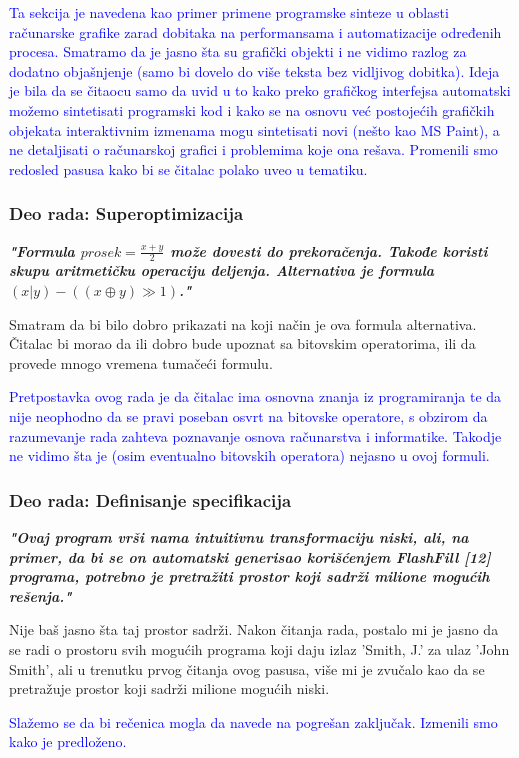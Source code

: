 \documentclass[a4paper]{report}
\newcommand{\odgovor}[1]{\textcolor{blue}{#1}}
\begin{document}
\odgovor{Ta sekcija je navedena kao primer primene programske sinteze u oblasti računarske grafike zarad dobitaka na performansama i automatizacije određenih procesa. Smatramo da je jasno šta su grafički objekti i ne vidimo razlog za dodatno objašnjenje (samo bi dovelo do više teksta bez vidljivog dobitka).  Ideja je bila da se čitaocu samo da uvid u to kako preko grafičkog interfejsa automatski možemo sintetisati programski kod i kako se na osnovu već postojećih grafičkih objekata interaktivnim izmenama mogu sintetisati novi (nešto kao MS Paint), a ne detaljisati o računarskoj grafici i problemima koje ona rešava. Promenili smo redosled pasusa kako bi se čitalac polako uveo u tematiku.}


\subsubsection{Deo rada: Superoptimizacija}
\textbf{\textit{"Formula $prosek = \frac{x+y}{2}$ može dovesti do prekoračenja. Takođe koristi skupu aritmetičku operaciju deljenja. Alternativa je formula $(x | y) - ((x \oplus y) \gg 1)$."}}

Smatram da bi bilo dobro prikazati na koji način je ova formula alternativa. Čitalac bi morao da ili dobro bude upoznat sa bitovskim operatorima, ili da provede mnogo vremena tumačeći formulu.

\odgovor {Pretpostavka ovog rada je da čitalac ima osnovna znanja iz programiranja te da nije neophodno da se pravi poseban osvrt na bitovske operatore, s obzirom da razumevanje rada zahteva poznavanje osnova računarstva i informatike. Takodje ne vidimo šta je (osim eventualno bitovskih operatora) nejasno u ovoj formuli.}


\subsubsection{Deo rada: Definisanje specifikacija}
\textbf{\textit{"Ovaj program vrši nama intuitivnu transformaciju niski, ali, na primer, da bi se on automatski generisao korišćenjem FlashFill [12] programa, potrebno je pretražiti prostor koji sadrži milione mogućih rešenja."}}

Nije baš jasno šta taj prostor sadrži. Nakon čitanja rada, postalo mi je jasno da se radi o prostoru svih mogućih programa koji daju izlaz 'Smith, J.' za ulaz 'John Smith', ali u trenutku prvog čitanja ovog pasusa, više mi je zvučalo kao da se pretražuje prostor koji sadrži milione mogućih niski.

\odgovor {Slažemo se da bi rečenica mogla da navede na pogrešan zaključak. Izmenili smo kako je predloženo.}
\end{document}
